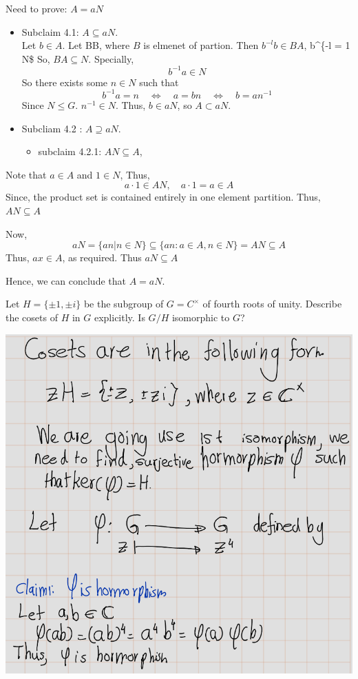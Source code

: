 \documentclass[
]{book}
\providecommand{\tightlist}{%
  \setlength{\itemsep}{0pt}\setlength{\parskip}{0pt}}
\begin{document}
Need to prove: \(A=aN\)

\begin{itemize}
\item
  Subclaim 4.1: \(A\subseteq aN\).\\
  Let \(b\in A\). Let B\in B, where \(B\) is elmenet of partion. Then
  \(b^{-l}b\in BA\), \quad b\^{}\{-l = 1 \in N\$ So, \(BA \subseteq N\).
  Specially, \[b^{-1}a \in N\] So there exists some \(n \in N\) such
  that \[b^{-1}a = n \quad \iff \quad a =bn \quad \iff \quad b=an^{-1}\]
  Since \(N\leq G\). \(n^{-1}\in N\). Thus, \(b \in aN\), so
  \(A \subset aN\).
\item
  Subcliam 4.2 : \(A\supseteq aN\).\\

  \begin{itemize}
  \tightlist
  \item
    subclaim 4.2.1: \(AN \subseteq A\),
  \end{itemize}
\end{itemize}

Note that \(a \in A\) and \(1 \in N\), Thus,
\[a\cdot 1\in AN, \quad a\cdot 1=a\in A\] Since, the product set is
contained entirely in one element partition. Thus, \(AN\subseteq A\)

Now,
\[aN=\{an | n \in N\} \subseteq \{an : a\in A, n\in N\} = AN \subseteq  A \]
Thus, \(ax \in A\), as required. Thus \(aN\subseteq A\)

Hence, we can conclude that \(A =aN\).

\leavevmode{}%
Let \(H = \{\pm1, \pm i\}\) be the subgroup of \(G = C^{\times}\) of
fourth roots of unity. Describe the cosets of \(H\) in \(G\) explicitly.
Is \(G / H\) isomorphic to \(G\)?

\includegraphics{figures/ch_2/fig36.png}
\end{document}
